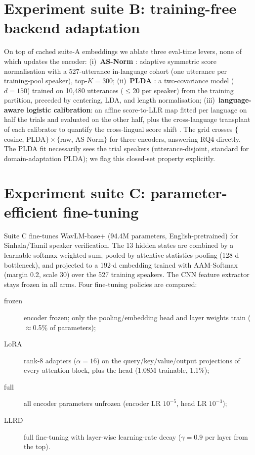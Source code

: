 \section{Experiment suite B: training-free backend adaptation}
\label{ssec:backend}

On top of cached suite-A embeddings we ablate three eval-time levers,
none of which updates the encoder:
(i)~\textbf{AS-Norm} \cite{matejka2017analysis}: adaptive symmetric
score normalisation with a 527-utterance in-language cohort (one
utterance per training-pool speaker), top-$K{=}300$;
(ii)~\textbf{PLDA} \cite{sizov2014unifying,kenny2010}: a
two-covariance model ($d{=}150$) trained on 10{,}480 utterances
($\leq$20 per speaker) from the training partition, preceded by
centering, LDA, and length normalisation;
(iii)~\textbf{language-aware logistic calibration}: an affine
score-to-LLR map fitted per language on half the trials and evaluated
on the other half, plus the cross-language transplant of each
calibrator to quantify the cross-lingual score shift
\cite{thienpondt2022calibration}. The grid crosses
$\{$cosine, PLDA$\}\times\{$raw, AS-Norm$\}$ for three encoders,
answering RQ4 directly. The PLDA fit necessarily sees the trial
speakers (utterance-disjoint, standard for domain-adaptation PLDA);
we flag this closed-set property explicitly.

\section{Experiment suite C: parameter-efficient fine-tuning}
\label{ssec:peft}

Suite C fine-tunes WavLM-base+ \cite{chen2022wavlm} (94.4M
parameters, English-pretrained) for Sinhala/Tamil speaker
verification. The 13 hidden states are combined by a learnable
softmax-weighted sum, pooled by attentive statistics pooling (128-d
bottleneck), and projected to a 192-d embedding trained with
AAM-Softmax \cite{deng2019arcface} (margin 0.2, scale 30) over the
527 training speakers. The CNN feature extractor stays frozen in all
arms. Four fine-tuning policies are compared:

\begin{description}
  \item[frozen] encoder frozen; only the pooling/embedding head and
  layer weights train ($\approx$0.5\% of parameters);
  \item[LoRA] rank-8 adapters ($\alpha{=}16$) \cite{hu2022lora} on the
  query/key/value/output projections of every attention block, plus
  the head (1.08M trainable, 1.1\%);
  \item[full] all encoder parameters unfrozen (encoder LR $10^{-5}$,
  head LR $10^{-3}$);
  \item[LLRD] full fine-tuning with layer-wise learning-rate decay
  ($\gamma{=}0.9$ per layer from the top).
\end{description}

